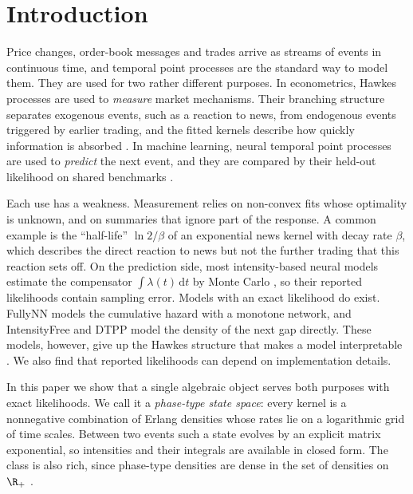 \section{Introduction}\label{sec:intro}

Price changes, order-book messages and trades arrive as streams of events in continuous time,
and temporal point processes are the standard way to model them. They are used for two rather
different purposes. In econometrics, Hawkes processes \citep{hawkes1971spectra} are used to
\emph{measure} market mechanisms. Their branching structure \citep{hawkes1974cluster} separates
exogenous events, such as
a reaction to news, from endogenous events triggered by earlier trading, and the fitted kernels
describe how quickly information is absorbed
\citep{hardiman2013critical,filimonov2012quantifying,rambaldi2015modeling}. In machine learning,
neural temporal point processes are used to \emph{predict} the next event, and they are compared
by their held-out likelihood on shared benchmarks
\citep{du2016recurrent,mei2017neural,zuo2020transformer,shchur2020intensity,xue2024easytpp,chang2025deep}.

Each use has a weakness. Measurement relies on non-convex fits whose optimality is unknown, and
on summaries that ignore part of the response. A common example is the ``half-life''
$\ln 2/\beta$ of an exponential news kernel with decay rate $\beta$, which describes the direct
reaction to news but not the further trading that this reaction sets off. On the prediction
side, most intensity-based neural models estimate the compensator $\int\lambda(t)\,\mathrm{d}t$
by Monte Carlo \citep{mei2017neural,zuo2020transformer,yang2022transformer,chang2025deep,boyd2025hyper}, so
their reported likelihoods contain sampling error. Models with an exact likelihood do exist.
FullyNN \citep{omi2019fully} models the cumulative hazard with a monotone network, and
IntensityFree \citep{shchur2020intensity} and DTPP \citep{panos2024decomposable} model the density
of the next gap directly. These models, however, give up the Hawkes structure that makes a model
interpretable \citep{shchur2021neural}.
We also find that reported likelihoods can depend on implementation details.

In this paper we show that a single algebraic object serves both purposes with exact
likelihoods. We call it a \emph{phase-type state space}: every kernel is a nonnegative
combination of Erlang densities whose rates lie on a logarithmic grid of time scales. Between
two events such a state evolves by an explicit matrix exponential, so intensities and their
integrals are available in closed form. The class is also rich, since phase-type densities are
dense in the set of densities on $\R_+$ \citep{asmussen1996fitting,lee2010modeling}.

